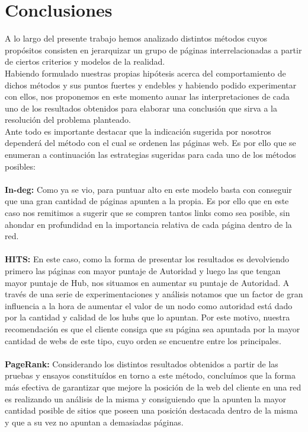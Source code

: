 \documentclass[a4paper]{article}
\begin{document}
\newpage
\section{Conclusiones}
A lo largo del presente trabajo hemos analizado distintos métodos cuyos propósitos consisten en jerarquizar un grupo de páginas interrelacionadas a partir de ciertos criterios y modelos de la realidad. \\
\indent Habiendo formulado nuestras propias hipótesis acerca del comportamiento de dichos métodos y sus puntos fuertes y endebles y habiendo podido experimentar con ellos, nos proponemos en este momento aunar las interpretaciones de cada uno de los resultados obtenidos para elaborar una conclusión que sirva a la resolución del problema planteado.\\
\indent Ante todo es importante destacar que la indicación sugerida por nosotros dependerá del método con el cual se ordenen las páginas web. Es por ello que se enumeran a continuación las estrategias sugeridas para cada uno de los métodos posibles:\\
\\
\indent \textbf{In-deg:} Como ya se vio, para puntuar alto en este modelo basta con conseguir que una gran cantidad de páginas apunten a la propia. Es por ello que en este caso nos remitimos a sugerir que se compren tantos links como sea posible, sin ahondar en profundidad en la importancia relativa de cada página dentro de la red.\\
\\
\indent \textbf{HITS:} En este caso, como la forma de presentar los resultados es devolviendo primero las p\'aginas con mayor puntaje de Autoridad y luego las que tengan mayor puntaje de Hub, nos situamos en aumentar su puntaje de Autoridad. A través de una serie de experimentaciones y análisis notamos que un factor de gran influencia a la hora de aumentar el valor de un nodo como autoridad está dado por la cantidad y calidad de los hubs que lo apuntan. Por este motivo, nuestra recomendación es que el cliente consiga que su página sea apuntada por la mayor cantidad de webs de este tipo, cuyo orden se encuentre entre los principales.\\
\\
\indent  \textbf{PageRank:} Considerando los distintos resultados obtenidos a partir de las pruebas y ensayos constituídos en torno a este método, concluímos que la forma más efectiva de garantizar que mejore la posición de la web del cliente en una red es realizando un análisis de la misma y consiguiendo que la apunten la mayor cantidad posible de sitios que poseen una posición destacada dentro de la misma y que a su vez no apuntan a demasiadas páginas. \\
\end{document}
